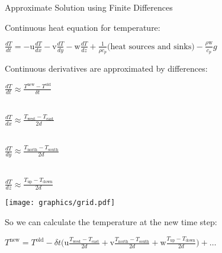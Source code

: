 \begin{slide}{Approximate Solution using Finite Differences}

\begin{list0}

\item Continuous heat equation for temperature:

$\frac{d T}{d t}
= -\text{u} \frac{dT}{dx} - \text{v} \frac{dT}{dy} - \text{w} \frac{dT}{dz}
+ \frac{1}{\rho c_p} \text{(heat sources and sinks)}
-\frac{\rho \text{w}}{c_p} g $
\end{list0}

\vspace{-24pt}
\begin{minipage}{0.59\linewidth}\raggedright
\begin{list0}
\item Continuous derivatives are approximated by differences:

$\frac{dT}{d t} \approx
\frac{T^\text{new} - T^\text{old}}{\delta t}$

\ \\
$\frac{dT}{dx} \approx \frac{T_\text{west} - T_\text{east}}{2d}$

\ \\
$\frac{dT}{dy} \approx \frac{T_\text{north} - T_\text{south}}{2d}$

\ \\
$\frac{dT}{dz} \approx \frac{T_\text{up} - T_\text{down}}{2d}$



\end{list0}
\end{minipage}
\begin{minipage}{0.39\linewidth}
\texttt{[image: graphics/grid.pdf]}
\end{minipage}

So we can calculate the temperature at the new time step:

$
T^\text{new} = T^\text{old} - \delta t
\biggl(
    \text{u}\frac{T_\text{west} - T_\text{east}}{2d}
  + \text{v}\frac{T_\text{north} - T_\text{south}}{2d}
  + \text{w}\frac{T_\text{up} - T_\text{down}}{2d}
\biggr) + \ldots
$
\end{slide}
